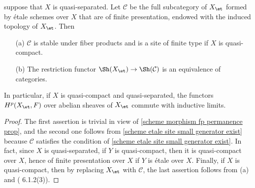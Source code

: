 \begin{corollary}\label{scheme qs etale site of fp scheme prop}
suppose that $X$ is quasi-separated. Let $\mathcal{C}$ be the full subcategory of $X_\et$ formed by \'etale schemes over $X$ that are of finite presentation, endowed with the induced topology of $X_\et$. Then
\begin{enumerate}
    \item[(a)] $\mathcal{C}$ is stable under fiber products and is a site of finite type if $X$ is quasi-compact.
    \item[(b)] The restriction functor $\Sh(X_\et)\to\Sh(\mathcal{C})$ is an equivalence of categories.
\end{enumerate}
In particular, if $X$ is quasi-compact and quasi-separated, the functors $H^p(X_\et,F)$ over abelian sheaves of $X_\et$ commute with inductive limits.
\end{corollary}
\begin{proof}
The first assertion is trivial in view of \cref{scheme morphism fp permanence prop}, and the second one follows from \cref{scheme etale site small generator exist} because $\mathcal{C}$ satisfies the condition of \cref{scheme etale site small generator exist}. In fact, since $X$ is quasi-separated, if $Y$ is quasi-compact, then it is quasi-compact over $X$, hence of finite presentation over $X$ if $Y$ is \'etale over $X$. Finally, if $X$ is quasi-compact, then by replacing $X_\et$ with $\mathcal{C}$, the last assertion follows from (a) and (\cite{SGA4-2}  6.1.2(3)).
\end{proof}

